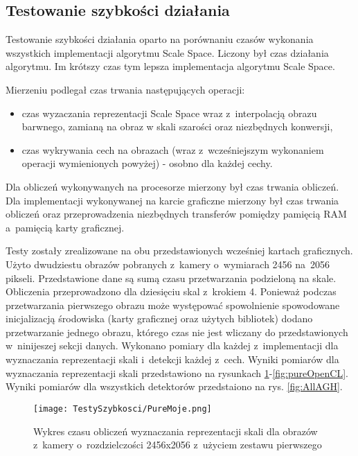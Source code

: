 \subsection{Testowanie szybkości działania}
\label{sec:testSzybkosci}

Testowanie szybkości działania oparto na porównaniu czasów wykonania wszystkich implementacji algorytmu Scale Space. Liczony był czas działania algorytmu. Im krótszy czas tym lepsza implementacja algorytmu Scale Space.

Mierzeniu podlegał czas trwania następujących operacji:
\begin{itemize}
\item czas wyzaczania reprezentacji Scale Space wraz z~interpolacją obrazu barwnego, zamianą na obraz w skali szarości oraz niezbędnych konwersji,
\item czas wykrywania cech na obrazach (wraz z~wcześniejszym wykonaniem operacji wymienionych powyżej) - osobno dla każdej cechy.
\end{itemize}

Dla obliczeń wykonywanych na procesorze mierzony był czas trwania obliczeń. Dla implementacji wykonywanej na karcie graficzne mierzony był czas trwania obliczeń oraz przeprowadzenia niezbędnych transferów pomiędzy pamięcią RAM a~pamięcią karty graficznej.

Testy zostały zrealizowane na obu przedstawionych wcześniej kartach graficznych. Użyto dwudziestu obrazów pobranych z~kamery o~wymiarach 2456 na~2056 pikseli. Przedstawione dane są sumą czasu przetwarzania podzieloną na skale. Obliczenia przeprowadzono dla dziesięciu skal z~krokiem 4. Ponieważ podczas przetwarzania pierwszego obrazu może występować spowolnienie spowodowane inicjalizacją środowiska (karty graficznej oraz użytych bibliotek) dodano przetwarzanie jednego obrazu, którego czas nie jest wliczany do przedstawionych w~ninijeszej sekcji danych. Wykonano pomiary dla każdej z~implementacji dla wyznaczania reprezentacji skali i~detekcji każdej z~cech. Wyniki pomiarów dla wyznaczania reprezentacji skali przedstawiono na rysunkach \ref{fig:pureSzybkoscMoje}-\ref{fig:pureOpenCL}. Wyniki pomiarów dla wszystkich detektorów przedstaiono na rys. \ref{fig:AllAGH}.

\begin{figure}[h]
\begin{center}
\texttt{[image: TestySzybkosci/PureMoje.png]}
\end{center}
\caption{Wykres czasu obliczeń wyznaczania reprezentacji skali dla obrazów z~kamery o~rozdzielczości 2456x2056 z~użyciem zestawu pierwszego}
\label{fig:pureSzybkoscMoje}
\end{figure}

